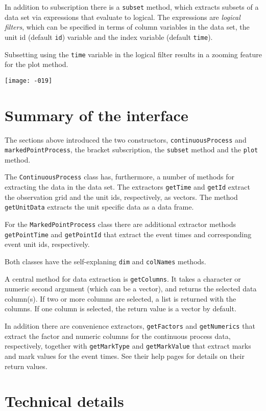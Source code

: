 \documentclass[11pt,a4paper,twoside]{article}
\begin{document}
In addition to subscription there is a \verb+subset+ method, which 
extracts subsets of a data set via expressions that evaluate to
logical. The expressions are 
\emph{logical filters}, which can be specified in terms of column variables
in the data set, the unit id (default \verb+id+) variable and the
index variable (default \verb+time+). 

Subsetting using the \verb+time+ variable in the logical filter results
in a zooming feature for the plot method.

\texttt{[image: -019]}

\section{Summary of the interface}

The sections above introduced the two constructors,
\verb+continuousProcess+ and \verb+markedPointProcess+, the
bracket subscription, the \verb+subset+ method and the \verb+plot+
method. 

The \verb+ContinuousProcess+ class has, furthermore, a number of
methods for extracting the data in the data set. The extractors
\verb+getTime+ and 
\verb+getId+  extract the
observation grid  and the unit ids, respectively, as vectors. The method
\verb+getUnitData+ extracts the unit specific data as a data frame.

For the \verb+MarkedPointProcess+ class there are additional extractor
methods \verb+getPointTime+ and \verb+getPointId+ that extract the event
times and corresponding event unit ids, respectively.

Both classes have the self-explaning \verb+dim+ and \verb+colNames+
methods.

A central method for data extraction is \verb+getColumns+. It takes a
character or numeric second argument (which can be a vector), and
returns the selected data column(s). If two or more columns are selected,
a list is returned with the columns. If one column is selected, the
return value is a vector by default. 

In addition there are convenience extractors, \verb+getFactors+ and 
\verb+getNumerics+ that extract the factor and numeric columns for the
continuous process data, respectively, together with \verb+getMarkType+
and \verb+getMarkValue+ that extract marks and mark values for the
event times. See their help pages for details on their return values. 
           
\section{Technical details}
\end{document}
